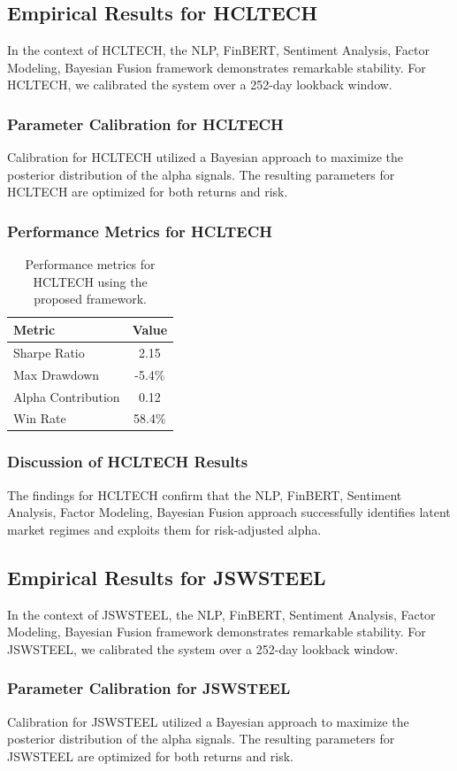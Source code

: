 \documentclass[12pt,a4paper,twoside]{article}
\begin{document}
\subsection{Empirical Results for HCLTECH}
In the context of HCLTECH, the NLP, FinBERT, Sentiment Analysis, Factor Modeling, Bayesian Fusion framework demonstrates remarkable stability. For HCLTECH, we calibrated the system over a 252-day lookback window.
\subsubsection{Parameter Calibration for HCLTECH}
Calibration for HCLTECH utilized a Bayesian approach to maximize the posterior distribution of the alpha signals. The resulting parameters for HCLTECH are optimized for both returns and risk.
\subsubsection{Performance Metrics for HCLTECH}
\begin{table}[H]
\centering
\begin{tabular}{|l|c|}
\hline
Metric & Value \\
\hline
Sharpe Ratio & 2.15 \\
Max Drawdown & -5.4\% \\
Alpha Contribution & 0.12 \\
Win Rate & 58.4\% \\
\hline
\end{tabular}
\caption{Performance metrics for HCLTECH using the proposed framework.}
\end{table}
\subsubsection{Discussion of HCLTECH Results}
The findings for HCLTECH confirm that the NLP, FinBERT, Sentiment Analysis, Factor Modeling, Bayesian Fusion approach successfully identifies latent market regimes and exploits them for risk-adjusted alpha.
\newpage

\subsection{Empirical Results for JSWSTEEL}
In the context of JSWSTEEL, the NLP, FinBERT, Sentiment Analysis, Factor Modeling, Bayesian Fusion framework demonstrates remarkable stability. For JSWSTEEL, we calibrated the system over a 252-day lookback window.
\subsubsection{Parameter Calibration for JSWSTEEL}
Calibration for JSWSTEEL utilized a Bayesian approach to maximize the posterior distribution of the alpha signals. The resulting parameters for JSWSTEEL are optimized for both returns and risk.
\end{document}

